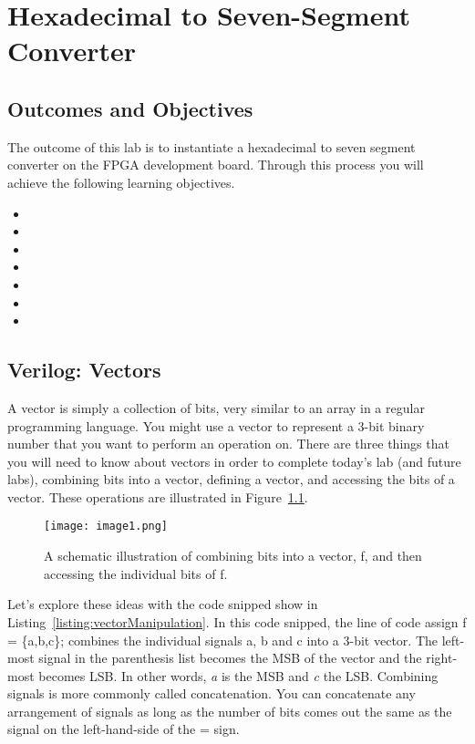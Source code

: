 \chapter{Hexadecimal to Seven-Segment Converter}
\label{chapter:HexToSeven}
\graphicspath{ {./Lab02HexToSeven/Fig} }

\section{Outcomes and Objectives}

The outcome of this lab is to instantiate a hexadecimal to seven segment converter
on the FPGA development board.  Through this process you will achieve the following
learning objectives.
\begin{itemize}
	\itemsep=0em
	\item {}
	\item {}
	\item {}
	\item {}	
	\item {}
	\item {}
	\item {}
\end{itemize}


\section{Verilog: Vectors}

A vector is simply a collection of bits, very similar to an array in a
regular programming language. You might use a vector to represent a
3-bit binary number that you want to perform an operation on. There are
three things that you will need to know about vectors in order to
complete today's lab (and future labs), combining bits into a vector,
defining a vector, and accessing the bits of a vector. These operations
are illustrated in Figure~\ref{fig:combinVector}.

\begin{figure}[ht]
\texttt{[image: image1.png]}
\caption{A schematic illustration of combining bits into a vector, f, 
and then accessing the individual bits of f.}
\label{fig:combinVector}
\end{figure}

Let's explore these ideas with the code snipped show in Listing~\ref{listing:vectorManipulation}. 
In this code snipped, the line of code assign f = \{a,b,c\}; combines the
individual signals a, b and c into a 3-bit vector. The left-most signal
in the parenthesis list becomes the MSB of the vector and the right-most
becomes LSB. In other words, \emph{a} is the MSB and \emph{c} the LSB.
Combining signals is more commonly called concatenation. You can
concatenate any arrangement of signals as long as the number of bits
comes out the same as the signal on the left-hand-side of the = sign.


